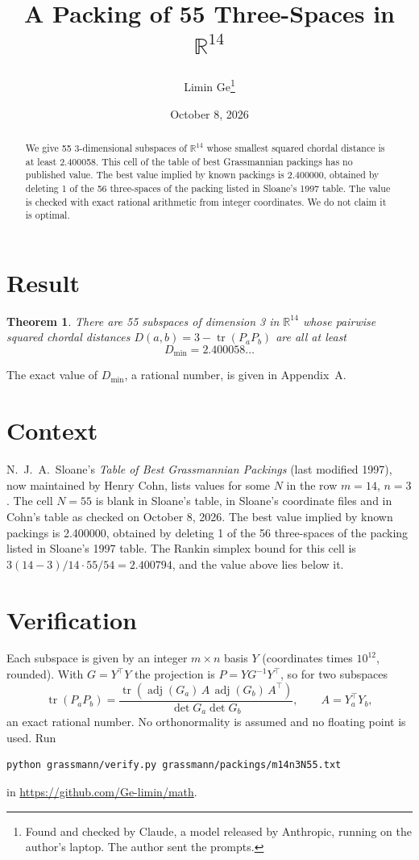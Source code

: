 \documentclass[11pt,a4paper]{article}
\title{A Packing of 55 Three-Spaces in $\mathbb{R}^{14}$}
\author{Limin Ge\thanks{Found and checked by Claude, a model released by Anthropic, running on the author's laptop. The author sent the prompts.}}
\date{October 8, 2026}
\newtheorem*{theorem}{Theorem}
\begin{document}
\maketitle
\begin{abstract}
We give 55 3-dimensional subspaces of $\mathbb{R}^{14}$ whose smallest squared chordal distance is at least 2.400058. This cell of the table of best Grassmannian packings has no published value. The best value implied by known packings is 2.400000, obtained by deleting 1 of the 56 three-spaces of the packing listed in Sloane's 1997 table. The value is checked with exact rational arithmetic from integer coordinates. We do not claim it is optimal.
\end{abstract}

\section{Result}
\begin{theorem}
There are 55 subspaces of dimension 3 in $\mathbb{R}^{14}$ whose pairwise squared chordal distances $D(a,b) = 3 - \operatorname{tr}(P_aP_b)$ are all at least
\[ D_{\min} = 2.400058\ldots \]
\end{theorem}
The exact value of $D_{\min}$, a rational number, is given in Appendix~A.


\section{Context}
N.~J.~A.~Sloane's \emph{Table of Best Grassmannian Packings} (last modified 1997), now maintained by Henry Cohn, lists values for some $N$ in the row $m=14$, $n=3$. The cell $N=55$ is blank in Sloane's table, in Sloane's coordinate files and in Cohn's table as checked on October 8, 2026. The best value implied by known packings is 2.400000, obtained by deleting 1 of the 56 three-spaces of the packing listed in Sloane's 1997 table. The Rankin simplex bound for this cell is $3(14-3)/14\cdot 55/54 = 2.400794$, and the value above lies below it.


\section{Verification}
Each subspace is given by an integer $m\times n$ basis $Y$ (coordinates times $10^{12}$, rounded). With $G=Y^\top Y$ the projection is $P=YG^{-1}Y^\top$, so for two subspaces
\[ \operatorname{tr}(P_aP_b)=\frac{\operatorname{tr}(\operatorname{adj}(G_a)\,A\,\operatorname{adj}(G_b)\,A^\top)}{\det G_a\det G_b},\qquad A=Y_a^\top Y_b, \]
an exact rational number. No orthonormality is assumed and no floating point is used. Run
\begin{verbatim}
python grassmann/verify.py grassmann/packings/m14n3N55.txt
\end{verbatim}
in \url{https://github.com/Ge-limin/math}.
\end{document}

